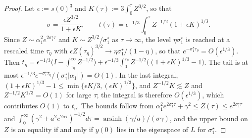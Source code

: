 \documentclass[11pt]{article}
\theoremstyle{definition}
\numberwithin{equation}{section}
\begin{document}
\begin{proof}
Let $\epsilon:=s(0)^3$ and $K(\tau):=3\int_0^\tau Z^{3/2}$, so that
\[
\sigma=\frac{\epsilon Z^{3/2}}{1+\epsilon K},\qquad t(\tau)=\epsilon^{-1/3}\int_0^\tau Z^{-1/2}(1+\epsilon K)^{1/3}.
\] Since $Z\sim\alpha_1^2e^{2\sigma^\star_1\tau}$ and $K\sim Z^{3/2}/\sigma^\star_1$ as $\tau\to\infty$, the level $\eta\sigma^\star_1$ is reached at a rescaled time $\tau_\eta$ with $\epsilon Z(\tau_\eta)^{3/2}\to\eta\sigma^\star_1/(1-\eta)$, so that $e^{-\sigma^\star_1\tau_\eta}=O(\epsilon^{1/3})$. Then $t_\eta=\epsilon^{-1/3}\big(I-\int_{\tau_\eta}^\infty Z^{-1/2}\big)+\epsilon^{-1/3}\int_0^{\tau_\eta}Z^{-1/2}\big((1+\epsilon K)^{1/3}-1\big)$. The tail is at most $\epsilon^{-1/3}e^{-\sigma^\star_1\tau_\eta}/(\sigma^\star_1|\alpha_1|)=O(1)$. In the last integral, $(1+\epsilon K)^{1/3}-1\le\min\{\epsilon K/3,(\epsilon K)^{1/3}\}$, and $Z^{-1/2}K\lesssim Z$ and $Z^{-1/2}K^{1/3}=O(1)$ for large $\tau$; the integral is therefore $O(\epsilon^{1/3})$, which contributes $O(1)$ to $t_\eta$. The bounds follow from $\alpha_1^2e^{2\sigma^\star_1\tau}+\gamma^2\le Z(\tau)\le e^{2\sigma^\star_1\tau}$ and $\int_0^\infty(\gamma^2+a^2e^{2\sigma\tau})^{-1/2}d\tau=\operatorname{arsinh}(\gamma/a)/(\sigma\gamma)$, and the upper bound on $Z$ is an equality if and only if $y(0)$ lies in the eigenspace of $L$ for $\sigma^\star_1$.
\end{proof}
\end{document}
